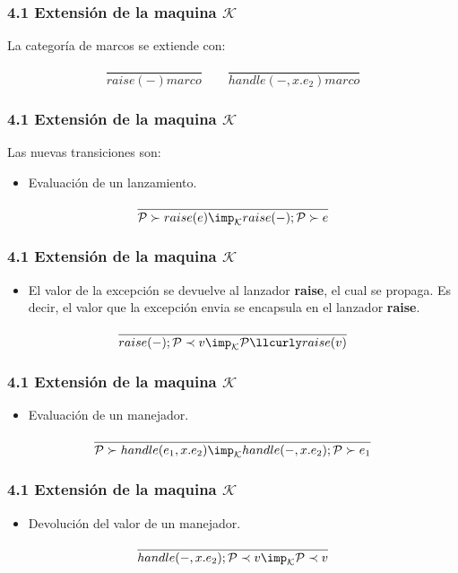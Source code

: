 \documentclass[xcolor=dvipsnames,table,spanish]{beamer}
\begin{document}
\begin{frame}
\frametitle{4.1 Extensión de la maquina $\mathcal{K}$}
La categoría de marcos se extiende con:

\begin{center}

      \begin{equation*}
         \frac{}{raise(-) marco}
         \qquad
           \frac{}{handle(-,x.e_2) marco}
	  \end{equation*}

  \end{center}
\end{frame}
\begin{frame}
\frametitle{4.1 Extensión de la maquina $\mathcal{K}$}
Las nuevas transiciones son:
\begin{itemize}
\item Evaluación de un lanzamiento.
\end{itemize}
\[ \frac{}{\mathcal{P} \succ raise(e) \imp_{\mathcal{K}} raise(-);\mathcal{P} \succ e}\]
\end{frame}
\begin{frame}
\frametitle{4.1 Extensión de la maquina $\mathcal{K}$}
\begin{itemize}
\item El valor de la excepción se devuelve al lanzador \textbf{raise}, el cual se propaga. Es decir, el valor que la excepción envia se encapsula en el lanzador \textbf{raise}.
\end{itemize}
\[ \frac{}{raise(-);\mathcal{P} \prec v \imp_{\mathcal{K}} \mathcal{P} \llcurly raise(v)}\]
\end{frame}
\begin{frame}
\frametitle{4.1 Extensión de la maquina $\mathcal{K}$}
\begin{itemize}
\item Evaluación de un manejador.
\end{itemize}

\[\frac{}{\mathcal{P} \succ handle(e_1,x.e_2) \imp_{\mathcal{K}} handle(-,x.e_2); \mathcal{P} \succ e_1}\]

\end{frame}
\begin{frame}
\frametitle{4.1 Extensión de la maquina $\mathcal{K}$}
\begin{itemize}
\item Devolución del valor de un manejador.
\end{itemize}

\[\frac{}{handle(-,x.e_2);\mathcal{P} \prec v \imp_{\mathcal{K}} \mathcal{P} \prec v}\]

\end{frame}
\end{document}
